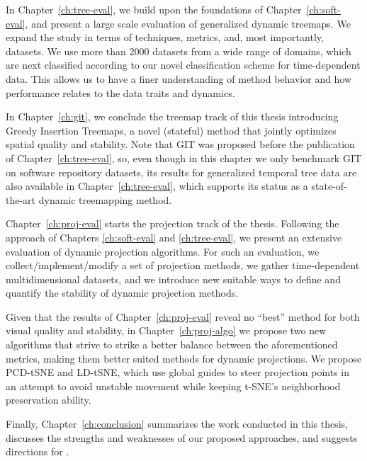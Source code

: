 In Chapter~\ref{ch:tree-eval}, we build upon the foundations of Chapter~\ref{ch:soft-eval}, and present a large scale evaluation of generalized dynamic treemaps. We expand the study in terms of techniques, metrics, and, most importantly, datasets. We use more than 2000 datasets from a wide range of domains, which are next classified according to our novel classification scheme for time-dependent data. This allows us to have a finer understanding of method behavior and how performance relates to the data traits and dynamics. 

In Chapter~\ref{ch:git}, we conclude the treemap track of this thesis introducing Greedy Insertion Treemaps, a novel (stateful) method that jointly optimizes spatial quality and stability. Note that GIT was proposed before the publication of Chapter~\ref{ch:tree-eval}, so, even though in this chapter we only benchmark GIT on software repository datasets, its results for generalized temporal tree data are also available in Chapter~\ref{ch:tree-eval}, which supports its status as a state-of-the-art dynamic treemapping method. 

Chapter~\ref{ch:proj-eval} starts the projection track of the thesis. Following the approach of Chapters \ref{ch:soft-eval} and \ref{ch:tree-eval}, we present an extensive evaluation of dynamic projection algorithms. For such an evaluation, we collect/implement/modify a set of projection methods, we gather time-dependent multidimensional datasets, and we introduce new suitable ways to define and quantify the stability of dynamic projection methods.

Given that the results of Chapter~\ref{ch:proj-eval} reveal no ``best'' method for both visual quality and stability, in Chapter~\ref{ch:proj-algo} we propose two new algorithms that strive to strike a better balance between the aforementioned metrics, making them better suited methods for dynamic projections. 
We propose PCD-tSNE and LD-tSNE, which use global guides to steer projection points in an attempt to avoid unstable movement while keeping t-SNE’s neighborhood preservation ability. 


Finally, Chapter~\ref{ch:conclusion} summarizes the work conducted in this thesis, discusses the strengths and weaknesses of our proposed approaches, and suggests directions for .








